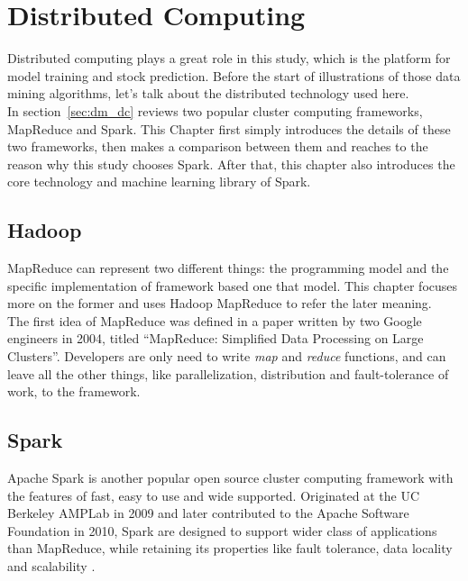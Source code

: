 \chapter{Distributed Computing}
\label{ch:spark}

Distributed computing plays a great role in this study, which is the platform for model training and stock prediction. Before the start of illustrations of those data mining algorithms, let’s talk about the distributed technology used here.\\


In section~\ref{sec:dm_dc} reviews two popular cluster computing frameworks, MapReduce and Spark. This Chapter first simply introduces the details of these two frameworks, then makes a comparison between them and reaches to the reason why this study chooses Spark. After that, this chapter also introduces the core technology and machine learning library of Spark.


\section{Hadoop}
MapReduce can represent two different things: the programming model and the specific implementation of framework based one that model.\cite{sammer2012hadoop} This chapter focuses more on the former and uses Hadoop MapReduce to refer the later meaning.\\

The first idea of MapReduce was defined in a paper written by two Google engineers in 2004, titled “MapReduce: Simplified Data Processing on Large Clusters”\cite{sammer2012hadoop}. Developers are only need to write \emph{map} and \emph{reduce} functions, and can leave all the other things, like parallelization, distribution and fault-tolerance of work, to the framework.


\section{Spark}

Apache Spark is another popular open source cluster computing framework with the features of fast, easy to use and wide supported. Originated at the UC Berkeley AMPLab in 2009 and later contributed to the Apache Software Foundation in 2010, Spark are designed to support wider class of applications than MapReduce, while retaining its properties like fault tolerance, data locality and scalability \cite{ryza2015advanced}.\\


